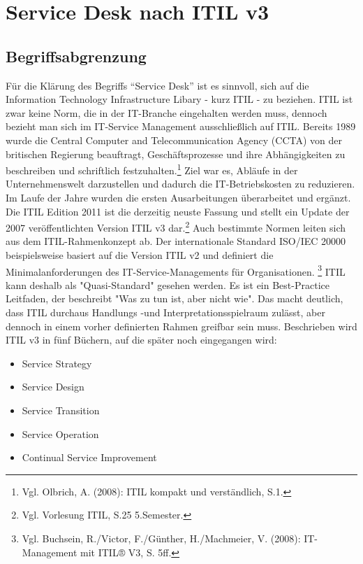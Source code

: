 \section{Service Desk nach ITIL v3}

\subsection{Begriffsabgrenzung}

\noindent Für die Klärung des Begriffs \enquote{Service Desk} ist es sinnvoll, sich auf die Information Technology Infrastructure Libary - kurz ITIL - zu beziehen.
ITIL ist zwar keine Norm, die in der IT-Branche eingehalten werden muss, dennoch bezieht man sich im IT-Service Management ausschließlich auf ITIL.
Bereits 1989 wurde die Central Computer and Telecommunication Agency (CCTA) von der britischen Regierung beauftragt, Geschäftsprozesse und ihre Abhängigkeiten zu beschreiben und schriftlich festzuhalten.\footnote{Vgl. Olbrich, A. (2008): ITIL kompakt und verständlich, S.1.}
Ziel war es, Abläufe in der Unternehmenswelt darzustellen und dadurch die IT-Betriebskosten zu reduzieren. Im Laufe der Jahre wurden die ersten Ausarbeitungen überarbeitet und ergänzt. Die ITIL Edition 2011 ist die derzeitig neuste Fassung und stellt ein Update der 2007 veröffentlichten Version ITIL v3 dar.\footnote{Vgl. Vorlesung ITIL, S.25 5.Semester.}
Auch bestimmte Normen leiten sich aus dem ITIL-Rahmenkonzept ab. Der internationale Standard ISO/IEC 20000 beispielsweise basiert auf die Version ITIL v2 und definiert die Minimalanforderungen des IT-Service-Managements für Organisationen. \footnote{Vgl. Buchsein, R./Victor, F./Günther, H./Machmeier, V. (2008): IT-Management mit ITIL® V3, S. 5ff.}
ITIL kann deshalb als "Quasi-Standard" gesehen werden. Es ist ein  Best-Practice Leitfaden, der beschreibt "Was zu tun ist, aber nicht wie". Das macht deutlich, dass ITIL durchaus Handlungs -und Interpretationsspielraum zulässt, aber dennoch in einem vorher definierten Rahmen greifbar sein muss. Beschrieben wird ITIL v3 in fünf Büchern, auf die später noch eingegangen wird:

\begin{itemize}
\item Service Strategy
\item Service Design
\item Service Transition
\item Service Operation
\item Continual Service Improvement
\end{itemize}

